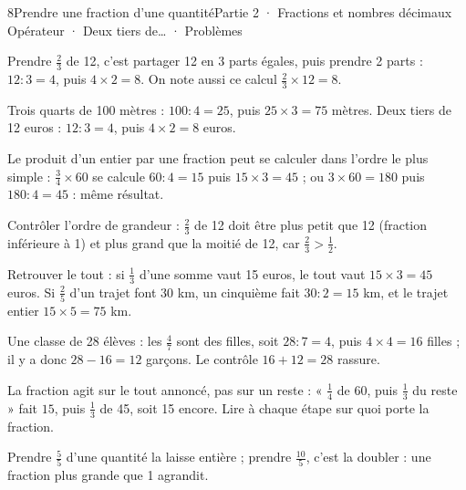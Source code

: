 \begin{ouverture}[calcul]{8}{Prendre une fraction d’une quantité}{Partie 2 · Fractions et nombres décimaux}
{Opérateur · Deux tiers de… · Problèmes}
\end{ouverture}
\pagestyle{otMain}\essentiel\fontsize{11}{15}\selectfont
{}\label{cours-8-1}
\begin{definition}Prendre $\frac23$ de 12, c’est partager 12 en 3 parts égales, puis prendre 2 parts : $12:3=4$, puis $4\times2=8$. On note aussi ce calcul $\frac23\times12=8$.\end{definition}
\begin{exemple}Trois quarts de 100 mètres : $100:4=25$, puis $25\times3=75$ mètres. Deux tiers de 12 euros : $12:3=4$, puis $4\times2=8$ euros.\end{exemple}
\begin{propriete}Le produit d’un entier par une fraction peut se calculer dans l’ordre le plus simple : $\frac34\times60$ se calcule $60:4=15$ puis $15\times3=45$ ; ou $3\times60=180$ puis $180:4=45$ : même résultat.\end{propriete}
\begin{savoirfaire}Contrôler l’ordre de grandeur : $\frac23$ de 12 doit être plus petit que 12 (fraction inférieure à 1) et plus grand que la moitié de 12, car $\frac23>\frac12$.\end{savoirfaire}
\clearpage
{}\label{cours-8-2}
\begin{savoirfaire}Retrouver le tout : si $\frac13$ d’une somme vaut 15 euros, le tout vaut $15\times3=45$ euros. Si $\frac25$ d’un trajet font 30 km, un cinquième fait $30:2=15$ km, et le trajet entier $15\times5=75$ km.\end{savoirfaire}
\begin{exemple}Une classe de 28 élèves : les $\frac47$ sont des filles, soit $28:7=4$, puis $4\times4=16$ filles ; il y a donc $28-16=12$ garçons. Le contrôle $16+12=28$ rassure.\end{exemple}
\begin{attention}La fraction agit sur le tout annoncé, pas sur un reste : « $\frac14$ de 60, puis $\frac13$ du reste » fait $15$, puis $\frac13$ de 45, soit 15 encore. Lire à chaque étape sur quoi porte la fraction.\end{attention}
\begin{propriete}Prendre $\frac55$ d’une quantité la laisse entière ; prendre $\frac{10}5$, c’est la doubler : une fraction plus grande que 1 agrandit.\end{propriete}


